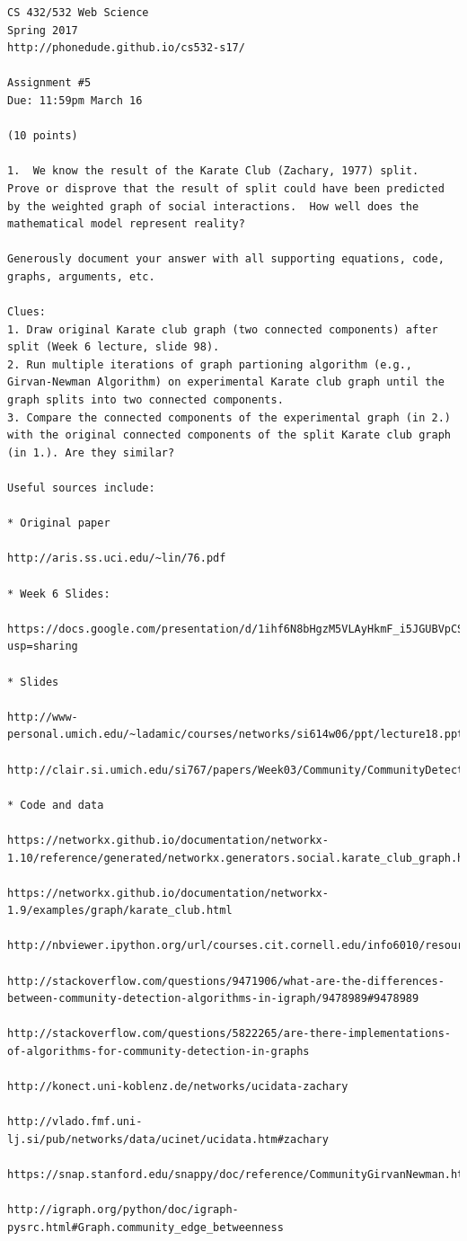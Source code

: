 \documentclass[letterpaper,11pt]{article}
\begin{document}
\begin{verbatim}
CS 432/532 Web Science
Spring 2017
http://phonedude.github.io/cs532-s17/

Assignment #5
Due: 11:59pm March 16

(10 points)

1.  We know the result of the Karate Club (Zachary, 1977) split.
Prove or disprove that the result of split could have been predicted
by the weighted graph of social interactions.  How well does the
mathematical model represent reality?

Generously document your answer with all supporting equations, code,
graphs, arguments, etc.

Clues: 
1. Draw original Karate club graph (two connected components) after split (Week 6 lecture, slide 98).
2. Run multiple iterations of graph partioning algorithm (e.g., Girvan-Newman Algorithm) on experimental Karate club graph until the graph splits into two connected components.
3. Compare the connected components of the experimental graph (in 2.) with the original connected components of the split Karate club graph (in 1.). Are they similar?

Useful sources include:

* Original paper

http://aris.ss.uci.edu/~lin/76.pdf

* Week 6 Slides:

https://docs.google.com/presentation/d/1ihf6N8bHgzM5VLAyHkmF_i5JGUBVpCSdsvYpk8XgHwo/edit?usp=sharing

* Slides

http://www-personal.umich.edu/~ladamic/courses/networks/si614w06/ppt/lecture18.ppt

http://clair.si.umich.edu/si767/papers/Week03/Community/CommunityDetection.pptx

* Code and data

https://networkx.github.io/documentation/networkx-1.10/reference/generated/networkx.generators.social.karate_club_graph.html

https://networkx.github.io/documentation/networkx-1.9/examples/graph/karate_club.html

http://nbviewer.ipython.org/url/courses.cit.cornell.edu/info6010/resources/11notes.ipynb

http://stackoverflow.com/questions/9471906/what-are-the-differences-between-community-detection-algorithms-in-igraph/9478989#9478989

http://stackoverflow.com/questions/5822265/are-there-implementations-of-algorithms-for-community-detection-in-graphs

http://konect.uni-koblenz.de/networks/ucidata-zachary

http://vlado.fmf.uni-lj.si/pub/networks/data/ucinet/ucidata.htm#zachary

https://snap.stanford.edu/snappy/doc/reference/CommunityGirvanNewman.html

http://igraph.org/python/doc/igraph-pysrc.html#Graph.community_edge_betweenness

\end{verbatim}
\end{document}
